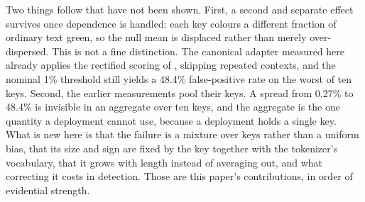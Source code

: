 \documentclass[conference]{IEEEtran}
\begin{document}
Two things follow that have not been shown. First, a second and separate effect
survives once dependence is handled: each key colours a different fraction of
ordinary text green, so the null mean is displaced rather than merely
over-dispersed. This is not a fine distinction. The canonical adapter measured
here already applies the rectified scoring of \citet{fernandez2023bricks},
skipping repeated contexts, and the nominal 1\% threshold still yields a 48.4\%
false-positive rate on the worst of ten keys. Second, the earlier measurements
pool their keys. A spread from 0.27\% to 48.4\% is invisible in an aggregate over
ten keys, and the aggregate is the one quantity a deployment cannot use, because a
deployment holds a single key. What is new here is that the failure is a mixture
over keys rather than a uniform bias, that its size and sign are fixed by the key
together with the tokenizer's vocabulary, that it grows with length instead of
averaging out, and what correcting it costs in detection. Those are this paper's
contributions, in order of evidential strength.
\end{document}
